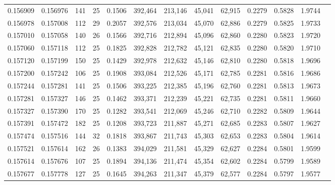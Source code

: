 \begin{tabular}{rrrrrrrrrrrrr}
0.156909 & 0.156976 & 141 &  25 &                                     0.1506 & 392,464 & 213,146 &  45,041 &  62,915 & 0.2279 & 0.5828 & 1.9744 \\
0.156978 & 0.157008 & 112 &  29 &                                     0.2057 & 392,576 & 213,034 &  45,070 &  62,886 & 0.2279 & 0.5825 & 1.9733 \\
0.157010 & 0.157058 & 140 &  26 &                                     0.1566 & 392,716 & 212,894 &  45,096 &  62,860 & 0.2280 & 0.5823 & 1.9720 \\
0.157060 & 0.157118 & 112 &  25 &                                     0.1825 & 392,828 & 212,782 &  45,121 &  62,835 & 0.2280 & 0.5820 & 1.9710 \\
0.157120 & 0.157199 & 150 &  25 &                                     0.1429 & 392,978 & 212,632 &  45,146 &  62,810 & 0.2280 & 0.5818 & 1.9696 \\
0.157200 & 0.157242 & 106 &  25 &                                     0.1908 & 393,084 & 212,526 &  45,171 &  62,785 & 0.2281 & 0.5816 & 1.9686 \\
0.157244 & 0.157281 & 141 &  25 &                                     0.1506 & 393,225 & 212,385 &  45,196 &  62,760 & 0.2281 & 0.5813 & 1.9673 \\
0.157281 & 0.157327 & 146 &  25 &                                     0.1462 & 393,371 & 212,239 &  45,221 &  62,735 & 0.2281 & 0.5811 & 1.9660 \\
0.157327 & 0.157390 & 170 &  25 &                                     0.1282 & 393,541 & 212,069 &  45,246 &  62,710 & 0.2282 & 0.5809 & 1.9644 \\
0.157391 & 0.157472 & 182 &  25 &                                     0.1208 & 393,723 & 211,887 &  45,271 &  62,685 & 0.2283 & 0.5807 & 1.9627 \\
0.157474 & 0.157516 & 144 &  32 &                                     0.1818 & 393,867 & 211,743 &  45,303 &  62,653 & 0.2283 & 0.5804 & 1.9614 \\
0.157521 & 0.157614 & 162 &  26 &                                     0.1383 & 394,029 & 211,581 &  45,329 &  62,627 & 0.2284 & 0.5801 & 1.9599 \\
0.157614 & 0.157676 & 107 &  25 &                                     0.1894 & 394,136 & 211,474 &  45,354 &  62,602 & 0.2284 & 0.5799 & 1.9589 \\
0.157677 & 0.157778 & 127 &  25 &                                     0.1645 & 394,263 & 211,347 &  45,379 &  62,577 & 0.2284 & 0.5797 & 1.9577 \\

\end{tabular}
